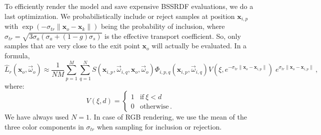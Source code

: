 \documentclass[10pt,a4paper]{article}
\begin{document}
To efficiently render the model and save expensive BSSRDF evaluations, we do a last optimization. We probabilistically include or reject samples at position $\mathbf{x}_{i,p}$ with $\exp(-\sigma_{tr} \| \mathbf{x}_o - \mathbf{x}_k \|)$ being the probability of inclusion, where $\sigma_{tr} = \sqrt{3 \sigma_a (\sigma_a + (1-g) \sigma_s)} $ is the effective transport coefficient. So, only samples that are very close to the exit point $\mathbf{x}_o$ will actually be evaluated. In a formula,
\begin{equation*}
\hat{L}_r(\mathbf{x}_o, \vec{\omega}_o) \approx  \frac{1}{NM} \sum_{p = 1}^M \sum_{q = 1}^N S(\mathbf{x}_{i,p}, \vec{\omega}_{i,q}, \mathbf{x}_o, \vec{\omega}_o) \Phi_{i,p,q}(\mathbf{x}_{i,p}, \vec{\omega}_{i,q}) V(\xi, e^{-\sigma_{tr} \| \mathbf{x}_o - \mathbf{x}_{i,p} \|})\; e^{\sigma_{tr} \| \mathbf{x}_o - \mathbf{x}_{i,p} \|} \, ,
\end{equation*}
where:
\begin{equation*}
V(\xi, d) = \begin{cases}
1 & \text{if} \ \xi < d \\
0 & \text{otherwise} \, .
\end{cases}
\end{equation*}
We have always used $N = 1$. In case of RGB rendering, we use the mean of the three color components in $\sigma_{tr}$ when sampling for inclusion or rejection.




\end{document}
